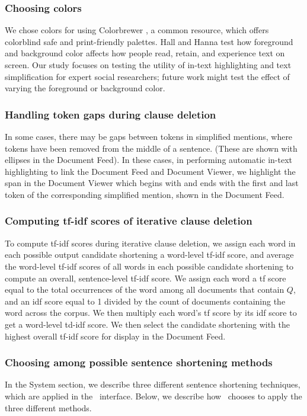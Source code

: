 \subsubsection*{Choosing colors}
We {chose colors for \ours} using Colorbrewer \cite{colorbrewer}, a common resource, which offers colorblind safe and print-friendly palettes.
Hall and Hanna \cite{HallAndHanna} test how foreground and background color affects how people read, retain, and experience text on screen. Our study focuses on testing the utility of in-text highlighting and text simplification for expert social researchers; future work might test the effect of varying the foreground or background color.

\subsubsection*{Handling token gaps during clause deletion}
In some cases, there may be gaps between tokens in simplified mentions, where tokens have been removed from the middle of a sentence. 
(These are shown with ellipses in the Document Feed).
In these cases, in performing {automatic in-text highlighting to link the Document Feed and Document Viewer}, we highlight the span in the Document Viewer which begins with and ends with the first and last token of the corresponding simplified mention, shown in the Document Feed.

\subsubsection*{Computing tf-idf scores of iterative clause deletion}
To compute tf-idf scores during iterative clause deletion, we assign each word in each possible output candidate shortening a word-level tf-idf score, and average the word-level tf-idf scores of all words in each possible candidate shortening to compute an overall, sentence-level tf-idf score. 
We assign each word a tf score equal to the total occurrences of the word among all documents that contain $Q$, and an idf score equal to 1 divided by the count of documents containing the word across the corpus.
We then multiply each word's tf score by its idf score to get a word-level td-idf score.
We then select the candidate shortening with the highest overall tf-idf score for display in the Document Feed.

\subsubsection*{Choosing among possible sentence shortening methods}
In the System section, we describe three different sentence shortening techniques, which are applied in the \ours~interface. 
Below, we describe how \ours~chooses to apply the three different methods.


